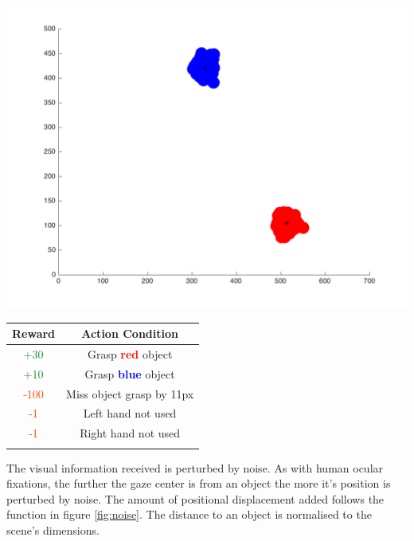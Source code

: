 \documentclass[11]{article}
\begin{document}
  \begin{minipage}[b]{0.39\textwidth}
    \includegraphics[width=1\textwidth]{Scene.png}
    \label{fig:scene}
  \end{minipage}
  \hfill
  \begin{minipage}[b]{0.60\textwidth}
    \centering
    \begin{tabular}{cc}\hline
        \textbf{Reward} & \textbf{Action Condition}\\ \hline
        
        \textcolor{ForestGreen}{+30} & Grasp \textbf{\textcolor{red}{red}} object \\
        \textcolor{ForestGreen}{+10} & Grasp \textbf{\textcolor{blue}{blue}} object \\
        \textcolor{OrangeRed}{-100} & Miss object grasp by 11px \\
        \textcolor{OrangeRed}{-1} & Left hand not used \\
        \textcolor{OrangeRed}{-1} & Right hand not used \\ \hline
        \\
        
      \end{tabular}
      \label{table:rewards}
    \end{minipage}
 
The visual information received is perturbed by noise. As with human ocular fixations, the further the gaze center is from an object the more it's position is perturbed by noise. The amount of positional displacement added follows the function in figure \ref{fig:noise}. The distance to an object is normalised to the scene's dimensions. 
\end{document}
